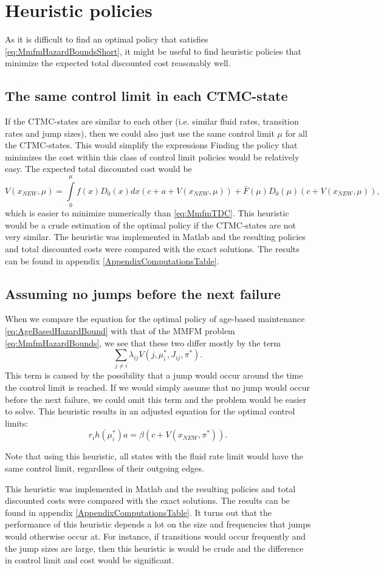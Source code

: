 \section{Heuristic policies}
As it is difficult to find an optimal policy that satisfies \eqref{eq:MmfmHazardBoundsShort}, it might be useful to find heuristic policies that minimize the expected total discounted cost reasonably well.

\subsection{The same control limit in each CTMC-state}
If the CTMC-states are similar to each other (i.e. similar fluid rates, transition rates and jump sizes), then we could also just use the same control limit $\mu$ for all the CTMC-states.
This would simplify the expressions 
Finding the policy that minimizes the cost within this class of control limit policies would be relatively easy.
The expected total discounted cost would be
\[
V(x_{NEW},\mu)=\int\limits_0^\mu f(x)D_0(x)dx (c+a+V(x_{NEW},\mu))+\bar{F}(\mu)D_0(\mu)(c+V(x_{NEW},\mu)),
\]
which is easier to minimize numerically than \eqref{eq:MmfmTDC}.
This heuristic would be a crude estimation of the optimal policy if the  CTMC-states are not very similar. 
The heuristic was implemented in Matlab and the resulting policies and total discounted costs were compared with the exact solutions.
The results can be found in appendix \ref{AppendixComputationsTable}.

\subsection{Assuming no jumps before the next failure}
When we compare the equation for the optimal policy of age-based maintenance \eqref{eq:AgeBasedHazardBound} with that of the MMFM problem \eqref{eq:MmfmHazardBounds},
we see that these two differ mostly by the term 
\[
\sum\limits_{j\neq i}\lambda_{ij}V(j,\mu_i^*,J_{ij},\pi^*).
\]
This term is caused by the possibility that a jump would occur around the time the control limit is reached.
If we would simply assume that no jump would occur before the next failure, we could omit this term and the problem would be easier to solve.
This heuristic results in an adjusted equation for the optimal control limits:
\[
r_ih(\mu_i^*)a=\beta(c+V(x_{NEW},\pi^*)).
\]
\begin{remark}
	Note that using this heuristic, all states with the fluid rate limit would have the same control limit, regardless of their outgoing edges.
\end{remark}
This heuristic was implemented in Matlab and the resulting policies and total discounted costs were compared with the exact solutions.
The results can be found in appendix \ref{AppendixComputationsTable}.
It turns out that the performance of this heuristic depends a lot on the size and frequencies that jumps would otherwise occur at.
For instance, if transitions would occur frequently and the jump sizes are large, then this heuristic is would be crude and the difference in control limit and cost would be significant.
